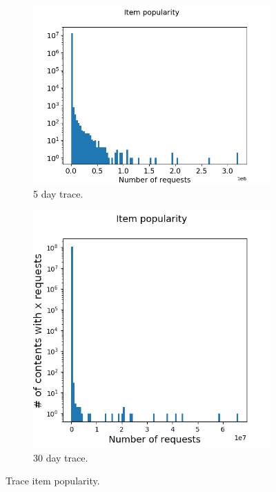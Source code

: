 \begin{figure}[b!]
	\centering
	
	\begin{subfigure}[b]{0.49\linewidth}
		\includegraphics[width=\linewidth]{pics/real_item_pop.png}
		\caption{5 day trace.}
	\end{subfigure}
	\begin{subfigure}[b]{0.49\linewidth}
		\includegraphics[width=\linewidth]{pics/real2_item_pop.png}
		\caption{30 day trace.}
	\end{subfigure}
	\caption{Trace item popularity.}
	\label{fig:pop_1}
\end{figure}

